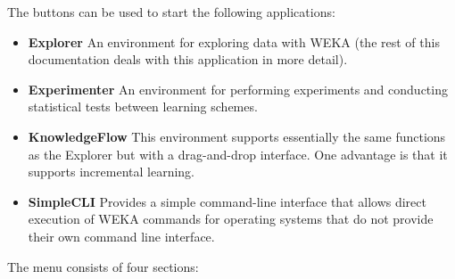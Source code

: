 The buttons can be used to start the following applications:

		\begin{itemize}
			\item \textbf{Explorer} An environment for exploring data with
WEKA (the rest of this documentation deals with this application in more detail).
			\item \textbf{Experimenter} An environment for performing experiments and conducting statistical tests
between learning schemes.
			\item \textbf{KnowledgeFlow} This environment supports essentially
the same functions as the Explorer but with a drag-and-drop
interface. One advantage is that it supports incremental learning.
			\item \textbf{SimpleCLI} Provides a simple command-line interface
that allows direct execution of WEKA commands for operating systems
that do not provide their own command line interface.
		\end{itemize}




The menu consists of four sections:

